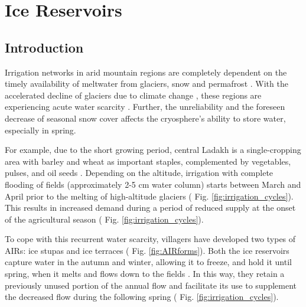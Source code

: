 \chapter{Ice Reservoirs}



\section{Introduction}

Irrigation networks in arid mountain regions are completely dependent on the timely availability
of meltwater from glaciers, snow and permafrost \citep{immerzeelImportanceVulnerabilityWorld2020,
farhanHydrologicalRegimesConjunction2015, tveitenGlacierGrowingLocal2007}. With the accelerated decline of
glaciers due to climate change \citep{nusserLocalKnowledgeGlobal2016}, these regions are experiencing acute
water scarcity \citep{norphelSnowWaterHarvesting2015, mukhopadhyayReevaluationSnowmeltGlacial2015}. Further, the
unreliability and the foreseen decrease of seasonal snow cover \citep{chevuturiClimateChangeLeh2018} affects the cryosphere's ability to store water, especially in spring.

For example, due to the short growing period, central Ladakh is a single-cropping area with barley and wheat as
important staples, complemented by vegetables, pulses, and oil seeds
\citep{nusserSociohydrologyArtificialGlaciers2019}. Depending on the altitude, irrigation with complete
flooding of fields (approximately 2-5 cm water column) starts between March and April prior to the melting of
high-altitude glaciers ( Fig. \ref{fig:irrigation_cycles}). This results in increased demand during a period of
reduced supply at the onset of the agricultural season ( Fig. \ref{fig:irrigation_cycles}).

To cope with this recurrent water scarcity, villagers have developed two types of \ac{AIRs}: ice stupas
and ice terraces ( Fig. \ref{fig:AIRforms}). Both the ice reservoirs capture water in the autumn and winter,
allowing it to freeze, and hold it until spring, when it melts and flows down to the fields
\citep{ipccChapterHighMountain2019, vinceGlacierMan2009, clouseLadakhArtificialGlaciers2017,
nusserSociohydrologyArtificialGlaciers2019}. In this way, they retain a previously unused portion of the annual
flow and facilitate its use to supplement the decreased flow during the following spring ( Fig.
\ref{fig:irrigation_cycles}).

